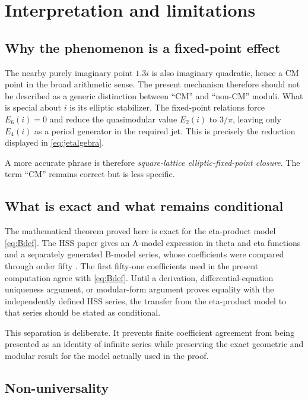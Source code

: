 \documentclass[11pt]{article}
\theoremstyle{definition}
\theoremstyle{remark}
\begin{document}
\section{Interpretation and limitations}\label{sec:discussion}

\subsection{Why the phenomenon is a fixed-point effect}

The nearby purely imaginary point \(1.3i\) is also imaginary quadratic, hence a CM point in the broad arithmetic sense. The present mechanism therefore should not be described as a generic distinction between ``CM'' and ``non-CM'' moduli. What is special about \(i\) is its elliptic stabilizer. The fixed-point relations force \(E_6(i)=0\) and reduce the quasimodular value \(E_2(i)\) to \(3/\pi\), leaving only \(E_4(i)\) as a period generator in the required jet. This is precisely the reduction displayed in \eqref{eq:jetalgebra}.

A more accurate phrase is therefore \emph{square-lattice elliptic-fixed-point closure}. The term ``CM'' remains correct but is less specific.

\subsection{What is exact and what remains conditional}

The mathematical theorem proved here is exact for the eta-product model \eqref{eq:Bdef}. The HSS paper gives an A-model expression in theta and eta functions and a separately generated B-model series, whose coefficients were compared through order fifty \cite{HSS}. The first fifty-one coefficients used in the present computation agree with \eqref{eq:Bdef}. Until a derivation, differential-equation uniqueness argument, or modular-form argument proves equality with the independently defined HSS series, the transfer from the eta-product model to that series should be stated as conditional.

This separation is deliberate. It prevents finite coefficient agreement from being presented as an identity of infinite series while preserving the exact geometric and modular result for the model actually used in the proof.

\subsection{Non-universality}
\end{document}
